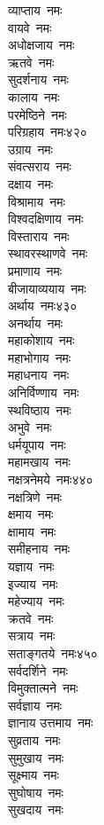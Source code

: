 \begin{multicols}{\maxColumns}
\begin{flushleft}
व्याप्ताय~नमः\\
वायवे~नमः\\
अधोक्षजाय~नमः\\
ऋतवे~नमः\\
सुदर्शनाय~नमः\\
कालाय~नमः\\
परमेष्ठिने~नमः\\
परिग्रहाय~नमः\hfill ४२०\\
उग्राय~नमः\\
संवत्सराय~नमः\\
दक्षाय~नमः\\
विश्रामाय~नमः\\
विश्वदक्षिणाय~नमः\\
विस्ताराय~नमः\\
स्थावरस्थाणवे~नमः\\
प्रमाणाय~नमः\\
बीजायाव्ययाय~नमः\\
अर्थाय~नमः\hfill ४३०\\
अनर्थाय~नमः\\
महाकोशाय~नमः\\
महाभोगाय~नमः\\
महाधनाय~नमः\\
अनिर्विण्णाय~नमः\\
स्थविष्ठाय~नमः\\
अभुवे~नमः\\
धर्मयूपाय~नमः\\
महामखाय~नमः\\
नक्षत्रनेमये~नमः\hfill ४४०\\
नक्षत्रिणे~नमः\\
क्षमाय~नमः\\
क्षामाय~नमः\\
समीहनाय~नमः\\
यज्ञाय~नमः\\
इज्याय~नमः\\
महेज्याय~नमः\\
क्रतवे~नमः\\
सत्राय~नमः\\
सताङ्गतये~नमः\hfill ४५०\\
सर्वदर्शिने~नमः\\
विमुक्तात्मने~नमः\\
सर्वज्ञाय~नमः\\
ज्ञानाय उत्तमाय~नमः\\
सुव्रताय~नमः\\
सुमुखाय~नमः\\
सूक्ष्माय~नमः\\
सुघोषाय~नमः\\
सुखदाय~नमः\\

\end{flushleft}
\end{multicols}
